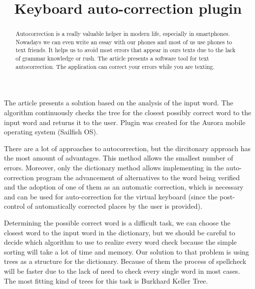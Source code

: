 \documentclass[conference]{IEEEtran}
\begin{document}
\title{	Keyboard auto-correction plugin}
\date{}%

\author{
}
\maketitle

\begin{abstract}
 Autocorrection is a really valuable helper in modern life, especially in smartphones. Nowadays we can even write an essay with our phones and most of us use phones to text friends. It helps us to avoid most errors that appear in ours texts due to the lack of grammar knowledge or rush.
The article presents a software tool for text autocorrection. The application can correct your errors while you are texting. 
\end{abstract}

\medskip
The article presents a solution based on the analysis of the input word.
The algorithm continuously checks the tree for the closest possibly correct word to the input word and returns it to the user. Plugin was created for the Aurora mobile operating system (Sailfish OS).

There are a lot of approaches to autocorrection, but the dircitonary approach has the most amount of advantages. This method allows the smallest number of errors. Moreover, only the dictionary method allows implementing in the auto-correction program the advancement of alternatives to the word being verified and the adoption of one of them as an automatic correction, which is necessary and can be used for auto-correction for the virtual keyboard (since the post-control of automatically corrected places by the user is provided).

Determining the possible correct word is a difficult task, we can choose the closest word to the input word in the dictionary, but we should be careful to decide which algorithm to use to realize every word check because the simple sorting will take a lot of time and memory. Our solution to that problem is using trees as a structure for the dictionary. Because of them the process of spellcheck will be faster due to the 
lack of need to check every single word in most cases. The most fitting kind of trees for this task is Burkhard Keller Tree. 
\end{document}
